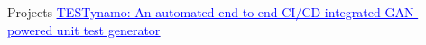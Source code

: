 \begin{rubric}{Projects}
\entry*[]%
\href{https://github.com/nandineebhatt/TESTynamo}{\textcolor{blue}{\underline{TESTynamo: An automated end-to-end CI/CD integrated GAN-powered unit test generator}}}
%
\end{rubric}